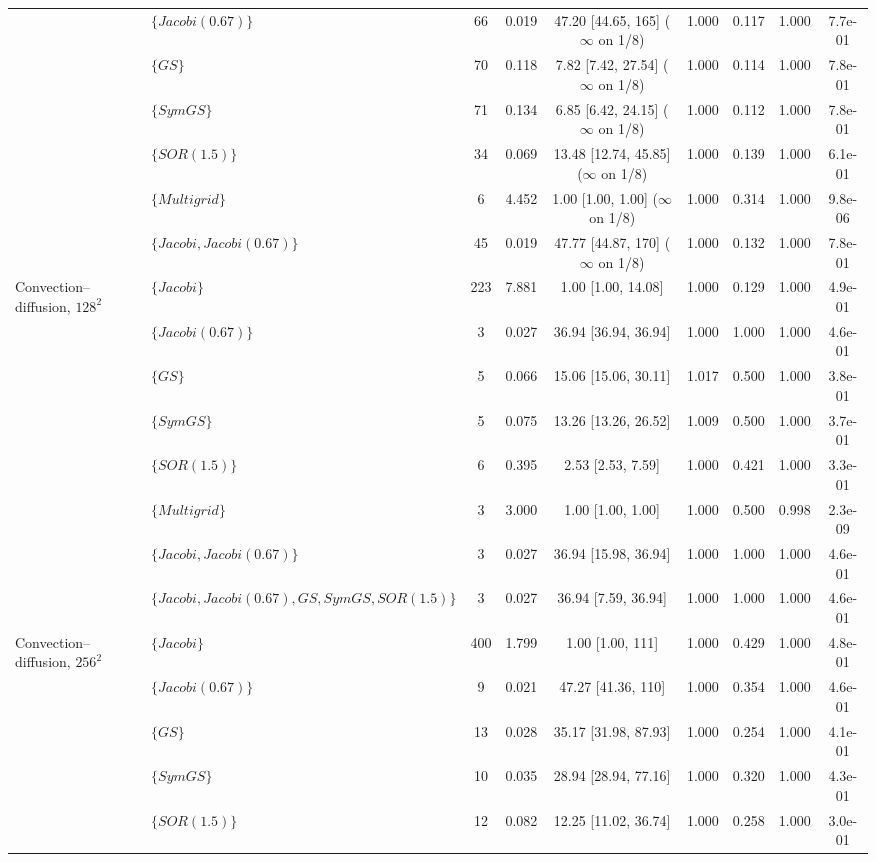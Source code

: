 {\begin{tabular}{llccccccc}
 & $\{Jacobi (0.67)\}$ & 66 & 0.019 & 47.20 [44.65, 165] ($\infty$ on 1/8) & 1.000 & 0.117 & 1.000 & 7.7e-01 \\
 & $\{GS\}$ & 70 & 0.118 & 7.82 [7.42, 27.54] ($\infty$ on 1/8) & 1.000 & 0.114 & 1.000 & 7.8e-01 \\
 & $\{SymGS\}$ & 71 & 0.134 & 6.85 [6.42, 24.15] ($\infty$ on 1/8) & 1.000 & 0.112 & 1.000 & 7.8e-01 \\
 & $\{SOR (1.5)\}$ & 34 & 0.069 & 13.48 [12.74, 45.85] ($\infty$ on 1/8) & 1.000 & 0.139 & 1.000 & 6.1e-01 \\
 & $\{Multigrid\}$ & 6 & 4.452 & 1.00 [1.00, 1.00] ($\infty$ on 1/8) & 1.000 & 0.314 & 1.000 & 9.8e-06 \\
 & $\{Jacobi, Jacobi (0.67)\}$ & 45 & 0.019 & 47.77 [44.87, 170] ($\infty$ on 1/8) & 1.000 & 0.132 & 1.000 & 7.8e-01 \\
\midrule
Convection--diffusion, $128^2$ & $\{Jacobi\}$ & 223 & 7.881 & 1.00 [1.00, 14.08] & 1.000 & 0.129 & 1.000 & 4.9e-01 \\
 & $\{Jacobi (0.67)\}$ & 3 & 0.027 & 36.94 [36.94, 36.94] & 1.000 & 1.000 & 1.000 & 4.6e-01 \\
 & $\{GS\}$ & 5 & 0.066 & 15.06 [15.06, 30.11] & 1.017 & 0.500 & 1.000 & 3.8e-01 \\
 & $\{SymGS\}$ & 5 & 0.075 & 13.26 [13.26, 26.52] & 1.009 & 0.500 & 1.000 & 3.7e-01 \\
 & $\{SOR (1.5)\}$ & 6 & 0.395 & 2.53 [2.53, 7.59] & 1.000 & 0.421 & 1.000 & 3.3e-01 \\
 & $\{Multigrid\}$ & 3 & 3.000 & 1.00 [1.00, 1.00] & 1.000 & 0.500 & 0.998 & 2.3e-09 \\
 & $\{Jacobi, Jacobi (0.67)\}$ & 3 & 0.027 & 36.94 [15.98, 36.94] & 1.000 & 1.000 & 1.000 & 4.6e-01 \\
 & $\{Jacobi, Jacobi (0.67), GS, SymGS, SOR (1.5)\}$ & 3 & 0.027 & 36.94 [7.59, 36.94] & 1.000 & 1.000 & 1.000 & 4.6e-01 \\
\midrule
Convection--diffusion, $256^2$ & $\{Jacobi\}$ & 400 & 1.799 & 1.00 [1.00, 111] & 1.000 & 0.429 & 1.000 & 4.8e-01 \\
 & $\{Jacobi (0.67)\}$ & 9 & 0.021 & 47.27 [41.36, 110] & 1.000 & 0.354 & 1.000 & 4.6e-01 \\
 & $\{GS\}$ & 13 & 0.028 & 35.17 [31.98, 87.93] & 1.000 & 0.254 & 1.000 & 4.1e-01 \\
 & $\{SymGS\}$ & 10 & 0.035 & 28.94 [28.94, 77.16] & 1.000 & 0.320 & 1.000 & 4.3e-01 \\
 & $\{SOR (1.5)\}$ & 12 & 0.082 & 12.25 [11.02, 36.74] & 1.000 & 0.258 & 1.000 & 3.0e-01 \\

\end{tabular}}
